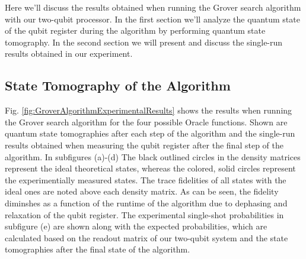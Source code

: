 Here we'll discuss the results obtained when running the Grover search algorithm with our two-qubit processor. In the first section we'll analyze the quantum state of the qubit register during the algorithm by performing quantum state tomography. In the second section we will present and discuss the single-run results obtained in our experiment.

\subsection{State Tomography of the Algorithm}

Fig. \ref{fig:GroverAlgorithmExperimentalResults} shows the results when running the Grover search algorithm for the four possible Oracle functions. Shown are quantum state tomographies after each step of the algorithm and the single-run results obtained when measuring the qubit register after the final step of the algorithm. In subfigures  (a)-(d) The black outlined circles in the density matrices represent the ideal theoretical states, whereas the colored, solid circles represent the experimentially measured states. The trace fidelities of all states with the ideal ones are noted above each density matrix. As can be seen, the fidelity diminshes as a function of the runtime of the algorithm due to dephasing and relaxation of the qubit register. The experimental single-shot probabilities in subfigure (e) are shown along with the expected probabilities, which are calculated based on the readout matrix of our two-qubit system and the state tomographies after the final state of the algorithm. 

